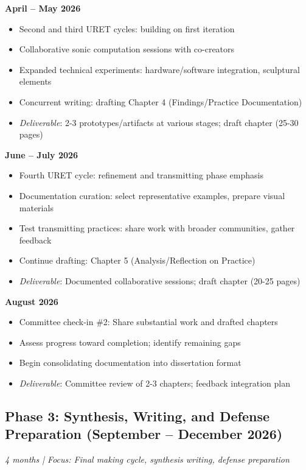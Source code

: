 \textbf{April – May 2026}
\begin{itemize}[noitemsep]
	\item Second and third URET cycles: building on first iteration
	\item Collaborative sonic computation sessions with co-creators
	\item Expanded technical experiments: hardware/software integration, sculptural elements
	\item Concurrent writing: drafting Chapter 4 (Findings/Practice Documentation)
	\item \textit{Deliverable}: 2-3 prototypes/artifacts at various stages; draft chapter (25-30 pages)
\end{itemize}

\textbf{June – July 2026}
\begin{itemize}[noitemsep]
	\item Fourth URET cycle: refinement and transmitting phase emphasis
	\item Documentation curation: select representative examples, prepare visual materials
	\item Test transmitting practices: share work with broader communities, gather feedback
	\item Continue drafting: Chapter 5 (Analysis/Reflection on Practice)
	\item \textit{Deliverable}: Documented collaborative sessions; draft chapter (20-25 pages)
\end{itemize}

\textbf{August 2026}
\begin{itemize}[noitemsep]
	\item Committee check-in \#2: Share substantial work and drafted chapters
	\item Assess progress toward completion; identify remaining gaps
	\item Begin consolidating documentation into dissertation format
	\item \textit{Deliverable}: Committee review of 2-3 chapters; feedback integration plan
\end{itemize}

\subsection*{Phase 3: Synthesis, Writing, and Defense Preparation (September – December 2026)}
\textit{4 months | Focus: Final making cycle, synthesis writing, defense preparation}

